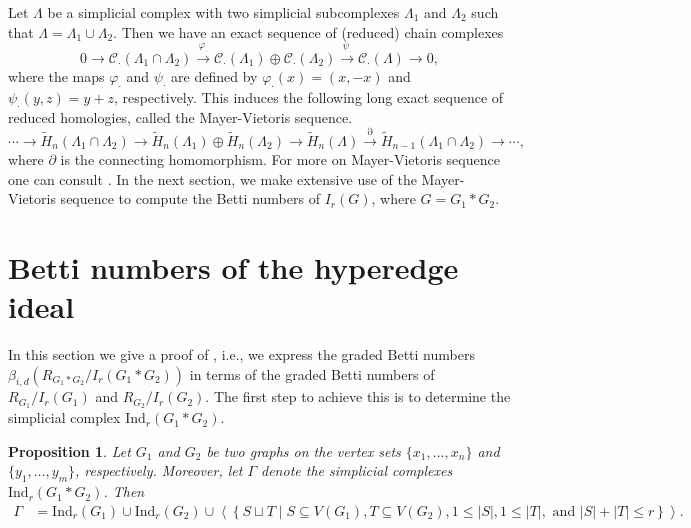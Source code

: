 \documentclass[12pt,reqno]{amsart}
\newtheorem{proposition}{Proposition}[section]
\theoremstyle{definition}
\newcommand{\rindj}{\mathrm{Ind}_r(G_1*G_2)}
\begin{document}
Let $\Lambda$ be a simplicial complex with two simplicial subcomplexes $\Lambda_1$ and $\Lambda_2$ such that $\Lambda=\Lambda_1\cup\Lambda_2$. Then we have an exact sequence of (reduced) chain complexes 
\[
0\rightarrow \mathcal C_{\cdot}(\Lambda_1\cap\Lambda_2)\xrightarrow{\varphi_{\cdot}} \mathcal C_{\cdot}(\Lambda_1)\oplus \mathcal C_{\cdot}(\Lambda_2)\xrightarrow{\psi_{\cdot}} \mathcal C_{\cdot}(\Lambda)\rightarrow 0,
\]
where the maps $\varphi_{\cdot}$ and $\psi_{\cdot}$ are defined by $\varphi_{\cdot}(x)=(x,-x)$ and $\psi_{\cdot}(y,z)=y+z$, respectively. This induces the following long exact sequence of reduced homologies, called the Mayer-Vietoris sequence.
\[
\cdots\rightarrow \widetilde H_n(\Lambda_1\cap\Lambda_2)\rightarrow \widetilde H_n(\Lambda_1)\oplus\widetilde H_n(\Lambda_2)\rightarrow \widetilde H_n(\Lambda)\xrightarrow{\partial}\widetilde H_{n-1}(\Lambda_1\cap\Lambda_2)\rightarrow\cdots,
\]
where $\partial$ is the connecting homomorphism. For more on Mayer-Vietoris sequence one can consult \cite[Section 2.2]{AH}. In the next section, we make extensive use of the Mayer-Vietoris sequence to compute the Betti numbers of $I_r(G)$, where $G=G_1*G_2$.


\section{Betti numbers of the hyperedge ideal}\label{Section 3}
In this section we give a proof of , i.e.,  we express the graded Betti numbers $\beta_{i,d}(R_{G_1*G_2}/I_r(G_1*G_2))$ in terms of the graded Betti numbers of $R_{G_1}/I_r(G_1)$ and $R_{G_2}/I_r(G_2)$. The first step to achieve this is to determine the simplicial complex $\rindj$. 

\begin{proposition}\label{prop1}
    Let $G_1$ and $G_2$ be two graphs on the vertex sets $\{x_1,\ldots,x_n\}$ and $\{y_1,\ldots,y_m\}$, respectively. Moreover, let $\Gamma$ denote the simplicial complexes $\mathrm{Ind}_r(G_1*G_2)$. Then 
    {\footnotesize
    \begin{align*}
        \Gamma&=\mathrm{Ind}_r(G_1)\cup \mathrm{Ind}_r(G_2)\cup \left\langle\left\{S\sqcup T\mid S\subseteq V(G_1), T\subseteq V(G_2), 1\le |S|, 1\le |T|, \text{ and } |S|+|T|\le r\right\}\right\rangle .
    \end{align*}
}
\end{proposition}
\end{document}
